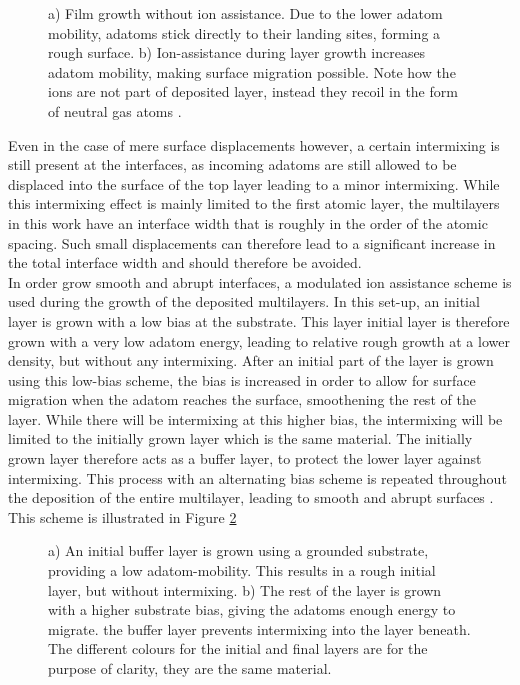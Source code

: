 \begin{figure}
	\centering
	\def\svgwidth{\textwidth}
	
	\caption{a) Film growth without ion assistance. Due to the lower adatom mobility, adatoms stick directly to their landing sites, forming a rough surface. b) Ion-assistance during layer growth increases adatom mobility, making surface migration possible. Note how the ions are not part of deposited layer, instead they recoil in the form of neutral gas atoms \cite{thesis_naureen}.}
	\label{layergrowth}
\end{figure}
Even in the case of mere surface displacements however, a certain intermixing is still present at the interfaces, as incoming adatoms are still allowed to be displaced into the surface of the top layer leading to a minor intermixing. While this intermixing effect is mainly limited to the first atomic layer, the multilayers in this work have an interface width that is roughly in the order of the atomic spacing. Such small displacements can therefore lead to a significant increase in the total interface width and should therefore be avoided.
\\
In order grow smooth and abrupt interfaces, a modulated ion assistance scheme is used during the growth of the deposited multilayers. In this set-up, an initial layer is grown with a low bias at the substrate. This layer initial layer is therefore grown with a very low adatom energy, leading to relative rough growth at a lower density, but without any intermixing. After an initial part of the layer is grown using this low-bias scheme, the bias is increased in order to allow for surface migration when the adatom reaches the surface, smoothening the rest of the layer. While there will be intermixing at this higher bias, the intermixing will be limited to the initially grown layer which is the same material. The initially grown layer therefore acts as a buffer layer, to protect the lower layer against intermixing. This process with an alternating bias scheme is repeated throughout the deposition of the entire multilayer, leading to smooth and abrupt surfaces \cite{thesis_fredrik}. This scheme is illustrated in Figure \ref{splitbias}
\begin{figure}
	\centering
	\def\svgwidth{\textwidth}
	
	\caption{a) An initial buffer layer is grown using a grounded substrate, providing a low adatom-mobility. This results in a rough initial layer, but without intermixing. b) The rest of the layer is grown with a higher substrate bias, giving the adatoms enough energy to migrate. the buffer layer prevents intermixing into the layer beneath. The different colours for the initial and final layers are for the purpose of clarity, they are the same material.}
\label{splitbias}
\end{figure}
